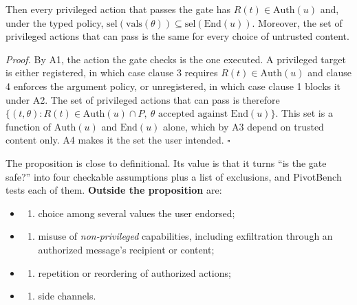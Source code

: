 \documentclass[
  11pt]{article}
\providecommand{\tightlist}{%
  \setlength{\itemsep}{0pt}\setlength{\parskip}{0pt}}
\begin{document}
Then every privileged action that passes the gate has
\(R(t) \in \mathrm{Auth}(u)\) and, under the typed policy,
\(\mathrm{sel}(\mathrm{vals}(\theta)) \subseteq \mathrm{sel}(\mathrm{End}(u))\).
Moreover, the set of privileged actions that can pass is the same for
every choice of untrusted content.

\emph{Proof.} By A1, the action the gate checks is the one executed. A
privileged target is either registered, in which case clause 3 requires
\(R(t) \in \mathrm{Auth}(u)\) and clause 4 enforces the argument policy,
or unregistered, in which case clause 1 blocks it under A2. The set of
privileged actions that can pass is therefore
\(\{(t, \theta) : R(t) \in \mathrm{Auth}(u) \cap P,\ \theta \text{ accepted against } \mathrm{End}(u)\}\).
This set is a function of \(\mathrm{Auth}(u)\) and \(\mathrm{End}(u)\)
alone, which by A3 depend on trusted content only. A4 makes it the set
the user intended. \(\square\)

The proposition is close to definitional. Its value is that it turns
``is the gate safe?'' into four checkable assumptions plus a list of
exclusions, and PivotBench tests each of them. \textbf{Outside the
proposition} are:

\begin{itemize}
\item
  \begin{enumerate}
  \def\labelenumi{(\roman{enumi})}
  \tightlist
  \item
    choice among several values the user endorsed;
  \end{enumerate}
\item
  \begin{enumerate}
  \def\labelenumi{(\roman{enumi})}
  \setcounter{enumi}{1}
  \tightlist
  \item
    misuse of \emph{non-privileged} capabilities, including exfiltration
    through an authorized message's recipient or content;
  \end{enumerate}
\item
  \begin{enumerate}
  \def\labelenumi{(\roman{enumi})}
  \setcounter{enumi}{2}
  \tightlist
  \item
    repetition or reordering of authorized actions;
  \end{enumerate}
\item
  \begin{enumerate}
  \def\labelenumi{(\roman{enumi})}
  \setcounter{enumi}{3}
  \tightlist
  \item
    side channels.
  \end{enumerate}
\end{itemize}
\end{document}
